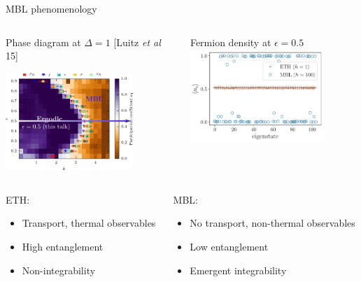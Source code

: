 \begin{frame}{MBL phenomenology}
\begin{columns}
\begin{column}{0.5\textwidth}
\centering
Phase diagram at $\Delta = 1$ {\footnotesize[Luitz \emph{et al} 15]}

\includegraphics[width=0.75\textwidth]{img/2_MBL/edge2}
\end{column}
\begin{column}{0.5\textwidth}
\centering
Fermion density at $\epsilon = 0.5$
\includegraphics[width=0.8\textwidth]{img/2_MBL/local_observable}
\end{column}
\end{columns}
\begin{columns}
\begin{column}{0.5\textwidth}
ETH:
\begin{itemize}
	\item Transport, thermal observables
	\item High entanglement
	\item Non-integrability
\end{itemize}
\end{column}
\begin{column}{0.5\textwidth}
MBL:
\begin{itemize}
	\item No transport, non-thermal observables
	\item Low entanglement
	\item Emergent integrability
\end{itemize}
\end{column}
\end{columns}
\end{frame}

